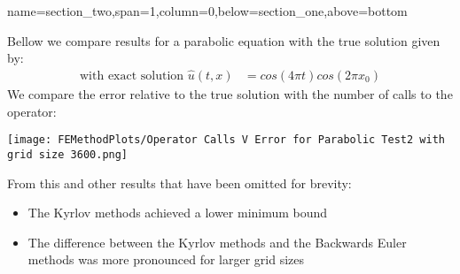 \documentclass[latin,a0paper,portrait]{xebaposter}
\begin{document}
\begin{poster}
{name=section_two,span=1,column=0,below=section_one,above=bottom}
{
Bellow we compare results for a parabolic equation with the true solution given by:
\begin{align*}
\text{with exact solution }\hat u(t,x) &= cos(4\pi t)cos(2\pi x_0)
\end{align*}
We compare the error relative to the true solution with the number of calls to the operator:
\begin{center}
    \texttt{[image: FEMethodPlots/Operator Calls V Error for Parabolic Test2 with grid size 3600.png]}
    \label{fig:example_c}
\end{center}
From this and other results that have been omitted for brevity:
\begin{itemize}
\item The Kyrlov methods achieved a lower minimum bound
\item The difference between the Kyrlov methods and the Backwards Euler methods was more pronounced for larger grid sizes
\end{itemize}
}



\end{poster}
\end{document}
